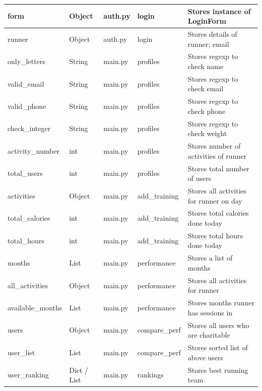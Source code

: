 \documentclass{article}[12pt,a4paper]
\begin{document}
\begin{longtable}{|l|l|l|l|l|}
form              & Object      & auth.py        & login               & Stores instance of LoginForm      \\ \hline
runner              & Object      & auth.py        & login               & Stores details of runner; email       \\ \hline
only\_letters     & String      & main.py        & profiles            & Stores regexp to check name       \\ \hline
valid\_email      & String      & main.py        & profiles            & Stores regexp to check email      \\ \hline
valid\_phone      & String      & main.py        & profiles            & Stores regexp to check phone      \\ \hline
check\_integer    & String      & main.py        & profiles            & Stores regexp to check weight     \\ \hline
activity\_number  & int         & main.py        & profiles            & Stores number of activities of runner \\ \hline
total\_users      & int         & main.py        & profiles            & Stores total number of users        \\ \hline
activities        & Object      & main.py        & add\_training       & Stores all activities for runner on day \\ \hline
total\_calories   & int         & main.py        & add\_training       & Stores total calories done today    \\ \hline
total\_hours      & int         & main.py        & add\_training       & Stores total hours done today       \\ \hline
months            & List        & main.py        & performance         & Stores a list of months             \\ \hline
all\_activities   & Object      & main.py        & performance         & Stores all activities for runner      \\ \hline
available\_months & List        & main.py        & performance         & Stores months runner has sessions in  \\ \hline
users             & Object      & main.py        & compare\_perf       & Stores all users who are charitable \\ \hline
user\_list        & List        & main.py        & compare\_perf       & Stores sorted list of above users   \\ \hline
user\_ranking     & Dict / List & main.py        & rankings            & Stores best running team            \\ \hline

\end{longtable}
\end{document}
